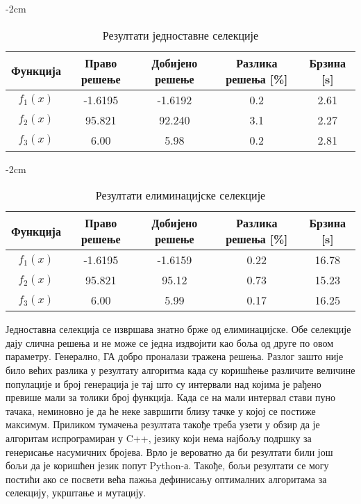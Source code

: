 \documentclass{article}
\begin{document}
\begin{table}[H]
    \centering
    \addtolength{\leftskip} {-2cm}
    \addtolength{\rightskip}{-2cm}
    \begin{tabular}{ |c|c|c|c|c| } 
        \hline
        \textbf{Функција} & \textbf{Право решење} & \textbf{Добијено решење} & \textbf{Разлика решења [\%]} & \textbf{Брзина [s]} \\ 
        \hline
        $f_1(x)$ & -1.6195 & -1.6192 & 0.2 & 2.61 \\ 
        \hline                     
        $f_2(x)$ & 95.821 & 92.240 & 3.1 & 2.27 \\ 
        \hline                     
        $f_3(x)$ & 6.00 & 5.98 & 0.2 & 2.81 \\ 
        \hline                     
    \end{tabular}
    \caption{Резултати једноставне селекције}
\end{table}

\begin{table}[H]
    \centering
    \addtolength{\leftskip} {-2cm}
    \addtolength{\rightskip}{-2cm}
    \begin{tabular}{ |c|c|c|c|c| } 
        \hline
        \textbf{Функција} & \textbf{Право решење} & \textbf{Добијено решење} & \textbf{Разлика решења [\%]} & \textbf{Брзина [s]} \\ 
        \hline
        $f_1(x)$ & -1.6195 & -1.6159 & 0.22 & 16.78 \\ 
        \hline                     
        $f_2(x)$ & 95.821 & 95.12 & 0.73 & 15.23 \\ 
        \hline                     
        $f_3(x)$ & 6.00 & 5.99 & 0.17 & 16.25 \\ 
        \hline                     
    \end{tabular}
    \caption{Резултати елиминацијске селекције}
\end{table}

Једноставна селекција се извршава знатно брже од елиминацијске. Обе селекције дају слична решења 
и не може се једна издвојити као боља од друге по овом параметру. Генерално, ГА добро проналази тражена решења.
Разлог зашто није било већих разлика у резултату алгоритма када су коришћење различите величине популације и 
број генерација је тај што су интервали над којима је рађено превише мали за толики број функција. Када се на 
мали интервал стави пуно тачака, неминовно је да ће неке завршити близу тачке у којој се постиже максимум.
Приликом тумачења резултата такође треба узети у обзир да је алгоритам испрограмиран у C++, језику који нема 
најбољу подршку за генерисање насумичних бројева. Врло је вероватно да би резултати били још бољи да 
је коришћен језик попут Python-а. Такође, бољи резултати се могу постићи ако се посвети већа пажња дефинисању
оптималних алгоритама за селекцију, укрштање и мутацију.
\end{document}

